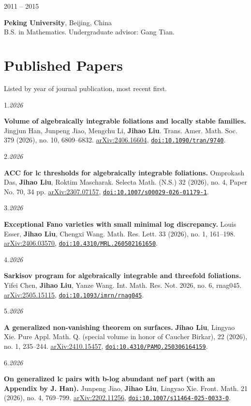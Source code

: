 \documentclass[11pt]{article}
\newcommand{\cvsection}[2]{%
  \Needspace{5\baselineskip}%
  \pdfbookmark[1]{#1}{#2}%
  \section*{#1}%
}
\newlength{\datewidth}
\newcommand{\entry}[2]{%
  \noindent
  \begin{minipage}[t]{\datewidth}
    \raggedright\small\color{muted}#1
  \end{minipage}%
  \hfill%
  \begin{minipage}[t]{\dimexpr\linewidth-\datewidth-0.1in\relax}
    \raggedright #2
  \end{minipage}\par\vspace{4pt}
}
\newcommand{\pubitem}[3]{%
  \noindent
  \begin{minipage}[t]{\datewidth}
    \raggedright\small\color{muted}#1.\;\textit{#2}
  \end{minipage}%
  \hfill%
  \begin{minipage}[t]{\dimexpr\linewidth-\datewidth-0.1in\relax}
    \raggedright #3
  \end{minipage}\par\vspace{4pt}
}
\newcommand{\paper}[1]{\textbf{#1}}
\newcommand{\me}{\textbf{Jihao Liu}}
\newcommand{\idlink}[2]{\href{#1}{\nolinkurl{#2}}}
\begin{document}
\entry{2011 -- 2015}{\textbf{Peking University}, Beijing, China\\ B.S. in Mathematics. Undergraduate advisor: Gang Tian.}

\cvsection{Published Papers}{published}
{\small\color{muted}\noindent Listed by year of journal publication, most recent first.}\par\vspace{4pt}

\pubitem{1}{2026}{%
  \paper{Volume of algebraically integrable foliations and locally stable families.}
  Jingjun Han, Junpeng Jiao, Mengchu Li, \me.
  Trans. Amer. Math. Soc. 379 (2026), no. 10, 6809--6832.
  \href{https://arxiv.org/abs/2406.16604}{arXiv:2406.16604}, \idlink{https://doi.org/10.1090/tran/9740}{doi:10.1090/tran/9740}.}


\pubitem{2}{2026}{%
  \paper{ACC for lc thresholds for algebraically integrable foliations.}
  Omprokash Das, \me, Roktim Mascharak.
  Selecta Math. (N.S.) 32 (2026), no. 4, Paper No. 70, 34 pp.
  \href{https://arxiv.org/abs/2307.07157}{arXiv:2307.07157}, \idlink{https://doi.org/10.1007/s00029-026-01179-1}{doi:10.1007/s00029-026-01179-1}.}


\pubitem{3}{2026}{%
  \paper{Exceptional Fano varieties with small minimal log discrepancy.}
  Louis Esser, \me, Chengxi Wang.
  Math. Res. Lett. 33 (2026), no. 1, 161--198.
  \href{https://arxiv.org/abs/2406.03570}{arXiv:2406.03570}, \idlink{https://doi.org/10.4310/MRL.260502161650}{doi:10.4310/MRL.260502161650}.}


\pubitem{4}{2026}{%
  \paper{Sarkisov program for algebraically integrable and threefold foliations.}
  Yifei Chen, \me, Yanze Wang.
  Int. Math. Res. Not. 2026, no. 6, rnag045.
  \href{https://arxiv.org/abs/2505.15115}{arXiv:2505.15115}, \idlink{https://doi.org/10.1093/imrn/rnag045}{doi:10.1093/imrn/rnag045}.}


\pubitem{5}{2026}{%
  \paper{A generalized non-vanishing theorem on surfaces.}
  \me, Lingyao Xie.
  Pure Appl. Math. Q. (special volume in honor of Caucher Birkar), 22 (2026), no. 1, 235--244.
  \href{https://arxiv.org/abs/2410.15457}{arXiv:2410.15457}, \idlink{https://dx.doi.org/10.4310/PAMQ.250306164159}{doi:10.4310/PAMQ.250306164159}.}


\pubitem{6}{2026}{%
  \paper{On generalized lc pairs with b-log abundant nef part (with an Appendix by J. Han).}
  Junpeng Jiao, \me, Lingyao Xie.
  Front. Math. 21 (2026), no. 4, 769--799.
  \href{https://arxiv.org/abs/2202.11256}{arXiv:2202.11256}, \idlink{https://doi.org/10.1007/s11464-025-0033-0}{doi:10.1007/s11464-025-0033-0}.}
\end{document}
